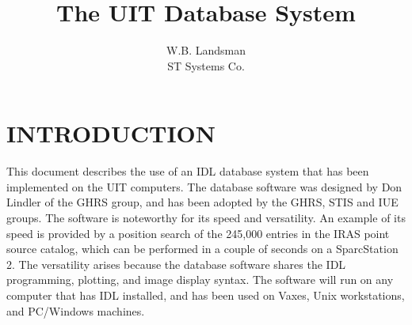 \topmargin -0.2in
\oddsidemargin-0.15in
\evensidemargin-0.25in
\textheight 8.5in     
\textwidth 6.5in
\newcommand{\de}{$^{\rm o}$ } 
\newcommand{\kms}{km~s$^{-1}$ } 
\newcommand{\exbegin}{\par\medskip}
\newcommand{\exend}{\medskip\noindent}
\newcommand{\exs}[2]{
\hbox to \hsize{\small\hskip .2in
\parbox[t]{2.2in}{\raggedright\setlength{\parindent}{-.2in}\tt #1}
\hspace{.2in}
\parbox[t]{3.4in}{\raggedright\setlength{\parindent}{-.2in}\rm #2}\hss}
\prevdepth=1.5pt\relax}
\newcommand{\exc}[2]{
\hbox to \hsize{\small\hskip .2in
\parbox[t]{3.0in}{\raggedright\setlength{\parindent}{-.2in}\tt #1}
\hspace{.2in}
\parbox[t]{2.6in}{\raggedright\setlength{\parindent}{-.2in}\rm #2}\hss}
\prevdepth=1.5pt\relax}
\newcommand{\exone}[1]{\begin{center}\tt #1 \end{center}}
\newcommand{\ea}{{\em et~al.} {}}
\newcommand{\apjl}{{\em Ap.~J. (Letters)}}

\title{The UIT Database System}
\author{W.B. Landsman \\ ST Systems Co.}
\maketitle
\section{INTRODUCTION}
This document describes the use of an IDL database system that has
been implemented on the UIT computers.  The database software was designed
by Don Lindler of the GHRS group, and has been adopted by the GHRS, STIS and IUE
groups.
The software is noteworthy for its speed
and versatility.  An example of its speed is provided by a position search 
of the 245,000 entries in the IRAS point source
catalog, which can be performed in a couple of seconds on a SparcStation 2.  
The versatility arises because
the database software shares the IDL programming, plotting, and 
image display syntax.   The software will run on any computer that has IDL
installed, and has been used on Vaxes, Unix workstations, and PC/Windows
machines.

